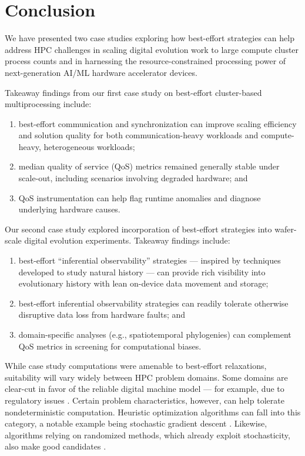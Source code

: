 \section{Conclusion} \label{moreno:sec:conclusion}

We have presented two case studies exploring how best-effort strategies can help address HPC challenges in scaling digital evolution work to large compute cluster process counts and in harnessing the resource-constrained processing power of next-generation AI/ML hardware accelerator devices.

Takeaway findings from our first case study on best-effort cluster-based multiprocessing include:
\begin{enumerate}
\item best-effort communication and synchronization can improve scaling efficiency and solution quality for both communication-heavy workloads and compute-heavy, heterogeneous workloads;
\item median quality of service (QoS) metrics remained generally stable under scale-out, including scenarios involving degraded hardware; and
\item QoS instrumentation can help flag runtime anomalies and diagnose underlying hardware causes.
\end{enumerate}

Our second case study explored incorporation of best-effort strategies into wafer-scale digital evolution experiments.
Takeaway findings include:
\begin{enumerate}
\item best-effort ``inferential observability'' strategies --- inspired by techniques developed to study natural history --- can provide rich visibility into evolutionary history with lean on-device data movement and storage;
\item best-effort inferential observability strategies can readily tolerate otherwise disruptive data loss from hardware faults; and
\item domain-specific analyses (e.g., spatiotemporal phylogenies) can complement QoS metrics in screening for computational biases.
\end{enumerate}

While case study computations were amenable to best-effort relaxations, suitability will vary widely between HPC problem domains.
Some domains are clear-cut in favor of the reliable digital machine model \cite{heroux2014toward} --- for example, due to regulatory issues \cite{dongarra2014applied}.
Certain problem characteristics, however, can help tolerate nondeterministic computation.
Heuristic optimization algorithms can fall into this category, a notable example being stochastic gradient descent \cite{dean2012large,zhao2019elastic,niu2011hogwild,noel2014dogwild,rhodes2020real}.
Likewise, algorithms relying on randomized methods, which already exploit stochasticity, also make good candidates \cite{chakrapani2008probabilistic,chakradhar2010best}.

